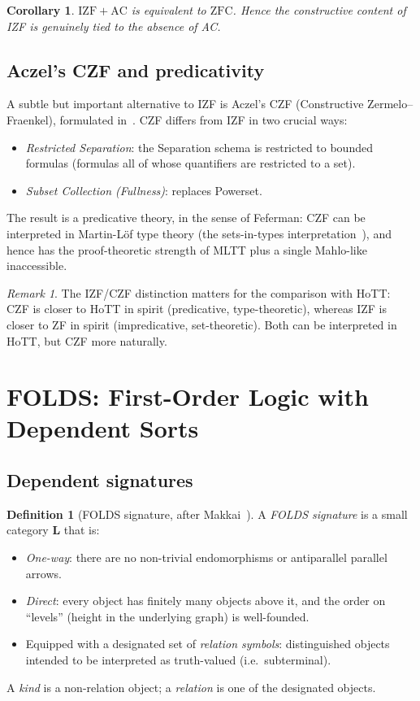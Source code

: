 \documentclass[12pt]{article}
\newtheorem{corollary}[theorem]{Corollary}
\theoremstyle{definition}
\newtheorem{definition}[theorem]{Definition}
\theoremstyle{remark}
\newtheorem{remark}[theorem]{Remark}
\begin{document}
\begin{corollary}
$\mathrm{IZF}+\mathrm{AC}$ is equivalent to $\mathrm{ZFC}$. Hence the constructive
content of IZF is genuinely tied to the absence of AC.
\end{corollary}

\subsection{Aczel's CZF and predicativity}

A subtle but important alternative to IZF is Aczel's CZF (Constructive
Zermelo--Fraenkel), formulated in~\cite{Aczel1978}. CZF differs from IZF in two crucial
ways:
\begin{itemize}
\item \emph{Restricted Separation}: the Separation schema is restricted to bounded
formulas (formulas all of whose quantifiers are restricted to a set).
\item \emph{Subset Collection (Fullness)}: replaces Powerset.
\end{itemize}
The result is a predicative theory, in the sense of Feferman: CZF can be interpreted
in Martin-L\"of type theory (the sets-in-types interpretation~\cite{Aczel1978}), and
hence has the proof-theoretic strength of MLTT plus a single Mahlo-like inaccessible.

\begin{remark}
The IZF/CZF distinction matters for the comparison with HoTT: CZF is closer to HoTT in
spirit (predicative, type-theoretic), whereas IZF is closer to ZF in spirit
(impredicative, set-theoretic). Both can be interpreted in HoTT, but CZF more
naturally.
\end{remark}

\section{FOLDS: First-Order Logic with Dependent Sorts}
\label{sec:folds}

\subsection{Dependent signatures}

\begin{definition}[FOLDS signature, after Makkai~\cite{Makkai1995}]
\label{def:foldssig}
A \emph{FOLDS signature} is a small category $\mathbf{L}$ that is:
\begin{itemize}
\item \emph{One-way}: there are no non-trivial endomorphisms or antiparallel parallel
arrows.
\item \emph{Direct}: every object has finitely many objects above it, and the order on
``levels'' (height in the underlying graph) is well-founded.
\item Equipped with a designated set of \emph{relation symbols}: distinguished objects
intended to be interpreted as truth-valued (i.e.\ subterminal).
\end{itemize}
A \emph{kind} is a non-relation object; a \emph{relation} is one of the designated objects.
\end{definition}
\end{document}
